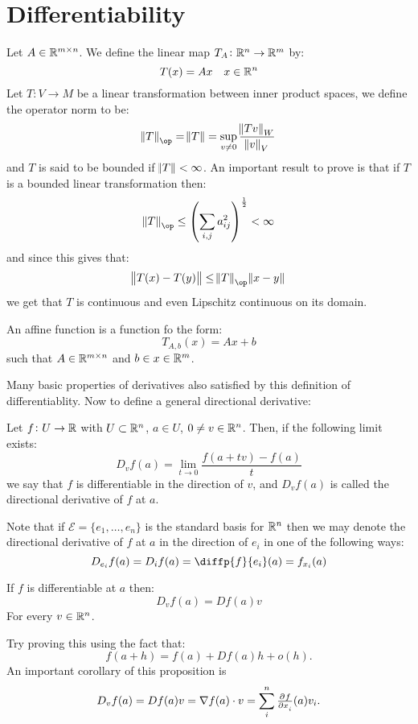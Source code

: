 \documentclass[11pt,a4paper]{article}
\begin{document}
\section{Differentiability}
Let $A \in \mathbb{R}^{m \times n}$. We define the linear map 
$T_A \colon \mathbb{R}^n \to \mathbb{R}^m$ by:
\[
  T(x) = Ax \quad x\in \mathbb{R}^n
\]
Let $T \colon V \to M$ be a linear transformation between inner product
spaces, we define the operator norm to be:
\[
  \norm{T}_{\op} = \norm{T} = 
  \sup_{v \neq 0} \frac{\norm{Tv}_W}{\norm{v}_V}
\]
and $T$ is said to be bounded if $\norm{T} < \infty$.
An important result to prove is that if $T$ is a bounded linear 
transformation then:
\[
  \norm{T}_{\op} \le 
  \del{\sum_{i,j} a_{ij}^2}^{\half} < \infty
\]
and since this gives that:
\[
  \norm{T(x) - T(y)} \le \norm{T}_{\op} \norm{x - y}
\]
we get that $T$ is continuous and even Lipschitz continuous on its domain.
\begin{definition}
An affine function is a function fo the form:
\[
  T_{A,b}(x) = Ax + b
\]
such that $A\in\mathbb{R}^{m \times n}$ and $b\in x\in \mathbb{R}^m$.
\end{definition}
\noindent Many basic properties of derivatives also satisfied by this
definition of differentiablity. Now to define a general directional
derivative:
\begin{definition}
  Let $f \colon U \to \mathbb{R}$ with $U \subset \mathbb{R}^n$, $a \in U$, $0 \neq v
  \in \mathbb{R}^n$. Then, if the following limit exists:
  \[
    D_v f(a) = \lim_{t \to 0}{\frac{f(a + tv) - f(a)}{t}}
  \]
  we say that $f$ is differentiable in the direction of $v$, and
  $D_v f(a)$ is called the directional derivative of $f$ at $a$.
\end{definition}

\begin{remark}
  Note that if $\mathcal{E} = \{e_1,\dots,e_n\}$ is the standard basis
  for $\mathbb{R}^n$ then we may denote the directional derivative of $f$ at $a$
  in the direction of $e_i$ in one of the following ways:
  \[
    D_{e_i} f(a) = D_i f(a) = \diffp{f}{{e_i}}(a) = 
    f_{x_i}(a)
  \]
\end{remark}

\begin{proposition}
  If $f$ is differentiable at $a$ then:
    \[
      D_v f(a) = D f(a) v
    \]	
  For every $v \in \mathbb{R}^n$.
\end{proposition} 
\noindent Try proving this using the fact that:
\[
  f(a+h) = f(a) + Df(a)h + o(h).
\]
An important corollary of this proposition is
\[
  D_vf(a) = D f(a) v = \nabla f(a) \cdot v = 
  \sum_{i}^{n} \pd{f}{x_i}(a)v_i.
\]
\end{document}
